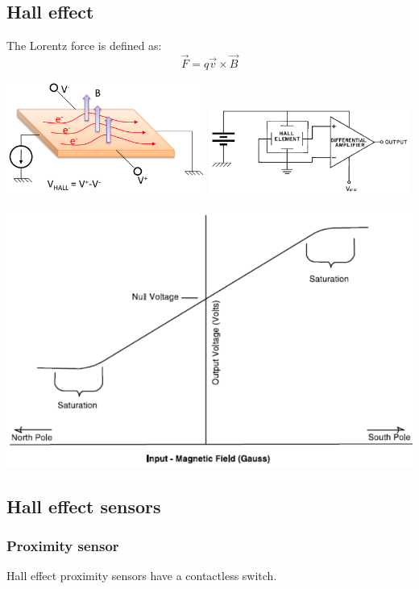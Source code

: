 \documentclass[11pt]{article}
\begin{document}
\subsection{Hall effect}
\label{sec:org921f1a8}
The Lorentz force is defined as:
\[\vec{F} = q \vec{v} \times \vec{B}\]

\begin{center}
\includegraphics[width=0.49\textwidth]{./images/hall-effect-diagram.png}
\includegraphics[width=0.49\textwidth]{./images/hall-effect-circuit-diagram.png}
\end{center}

\begin{center}
\includegraphics[width=.9\linewidth]{./images/hall-effect-voltage-against-magnetic-field-graph.png}
\end{center}

 \newpage
\subsection{Hall effect sensors}
\label{sec:org68ff1b2}

\subsubsection{Proximity sensor}
\label{sec:orge7c491d}
Hall effect proximity sensors have a contactless switch.
\end{document}
